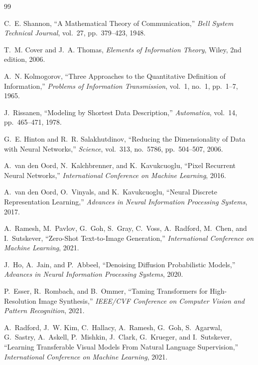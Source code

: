\documentclass[12pt,a4paper]{article}
\theoremstyle{definition}
\theoremstyle{remark}
\begin{document}
\newpage
\begin{thebibliography}{99}

C.~E. Shannon,
\newblock ``A Mathematical Theory of Communication,''
\newblock \emph{Bell System Technical Journal}, vol.~27, pp.~379--423, 1948.

T.~M. Cover and J.~A. Thomas,
\newblock \emph{Elements of Information Theory},
\newblock Wiley, 2nd edition, 2006.

A.~N. Kolmogorov,
\newblock ``Three Approaches to the Quantitative Definition of Information,''
\newblock \emph{Problems of Information Transmission}, vol.~1, no.~1, pp.~1--7, 1965.

J.~Rissanen,
\newblock ``Modeling by Shortest Data Description,''
\newblock \emph{Automatica}, vol.~14, pp.~465--471, 1978.

G.~E. Hinton and R.~R. Salakhutdinov,
\newblock ``Reducing the Dimensionality of Data with Neural Networks,''
\newblock \emph{Science}, vol.~313, no.~5786, pp.~504--507, 2006.

A.~van den Oord, N.~Kalchbrenner, and K.~Kavukcuoglu,
\newblock ``Pixel Recurrent Neural Networks,''
\newblock \emph{International Conference on Machine Learning}, 2016.

A.~van den Oord, O.~Vinyals, and K.~Kavukcuoglu,
\newblock ``Neural Discrete Representation Learning,''
\newblock \emph{Advances in Neural Information Processing Systems}, 2017.

A.~Ramesh, M.~Pavlov, G.~Goh, S.~Gray, C.~Voss, A.~Radford, M.~Chen, and I.~Sutskever,
\newblock ``Zero-Shot Text-to-Image Generation,''
\newblock \emph{International Conference on Machine Learning}, 2021.

J.~Ho, A.~Jain, and P.~Abbeel,
\newblock ``Denoising Diffusion Probabilistic Models,''
\newblock \emph{Advances in Neural Information Processing Systems}, 2020.

P.~Esser, R.~Rombach, and B.~Ommer,
\newblock ``Taming Transformers for High-Resolution Image Synthesis,''
\newblock \emph{IEEE/CVF Conference on Computer Vision and Pattern Recognition}, 2021.

A.~Radford, J.~W. Kim, C.~Hallacy, A.~Ramesh, G.~Goh, S.~Agarwal, G.~Sastry, A.~Askell, P.~Mishkin, J.~Clark, G.~Krueger, and I.~Sutskever,
\newblock ``Learning Transferable Visual Models From Natural Language Supervision,''
\newblock \emph{International Conference on Machine Learning}, 2021.


\end{thebibliography}
\end{document}
